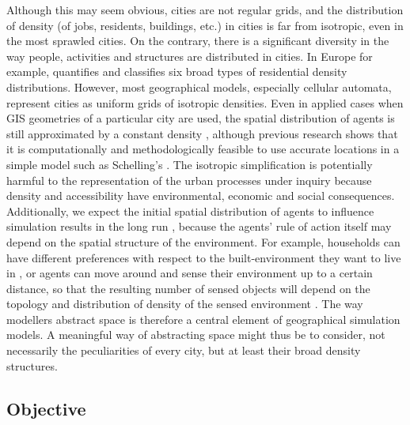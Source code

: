 \documentclass[Royal,sageh,times]{sagej}
\begin{document}
Although this may seem obvious, cities are not regular grids, and the distribution of density (of jobs, residents, buildings, etc.) in cities is far from isotropic, even in the most sprawled cities. On the contrary, there is a significant diversity in the way people, activities and structures are distributed in cities. In Europe for example, \citet{LeNechet2015} quantifies and classifies six broad types of residential density distributions. However, most geographical models, especially cellular automata, represent cities as uniform grids of isotropic densities. Even in applied cases when GIS geometries of a particular city are used, the spatial distribution of agents is still approximated by a constant density \citep{arribas2014diverse}, although previous research shows that it is computationally and methodologically feasible to use accurate locations in a simple model such as Schelling's \citep{benenson2002entity}. The isotropic simplification is potentially harmful to the representation of the urban processes under inquiry because density and accessibility have environmental, economic and social consequences. Additionally, we expect the initial spatial distribution of agents to influence simulation results in the long run \citep{Castellanoetal2009}, because the agents' rule of action itself may depend on the spatial structure of the environment. For example, households can have different preferences with respect to the built-environment they want to live in \citep{SpielmanHarrison2014}, or agents can move around and sense their environment up to a certain distance, so that the resulting number of sensed objects will depend on the topology \citep{Banos2012} and distribution of density of the sensed environment \citep{LauriJaggi2003, FossettDietrich2009}. The way modellers abstract space is therefore a central element of geographical simulation models. A meaningful way of abstracting space might thus be to consider, not necessarily the peculiarities of every city, but at least their broad density structures.

\subsection{Objective}
\end{document}
